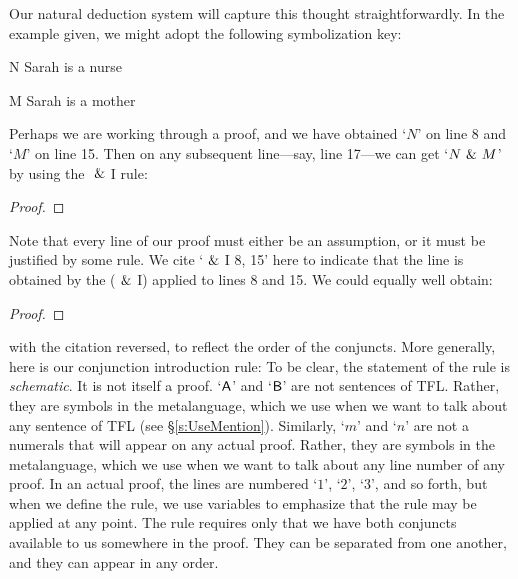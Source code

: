 Our natural deduction system will capture this thought straightforwardly. In the example given, we might adopt the following symbolization key:
	\begin{ekey}
		\item[N] Sarah is a nurse
		\item[M] Sarah is a mother
	\end{ekey}
Perhaps we are working through a proof, and we have obtained `$N$' on line 8 and `$M$' on line 15. Then on any subsequent line---say, line 17---we can get `$N ~\&~ M$' by using the $~\&~$I rule:
\begin{proof}
	 \by{\ldots}{}
	 \by{\ldots}{}
	 
\end{proof}
Note that every line of our proof must either be an assumption, or it must be justified by some rule. We cite `$~\&~$I 8, 15' here to indicate that the line is obtained by the  ($~\&~$I) applied to lines 8 and 15. We could equally well obtain:
\begin{proof}
	 
\end{proof}
with the citation reversed, to reflect the order of the conjuncts. More generally, here is our conjunction introduction rule:
To be clear, the statement of the rule is \emph{schematic}. It is not itself a proof.  `$\mathsf{A}$' and `$\mathsf{B}$' are not sentences of TFL. Rather, they are symbols in the metalanguage, which we use when we want to talk about any sentence of TFL (see \S\ref{s:UseMention}). Similarly, `$m$' and `$n$' are not a numerals that will appear on any actual proof. Rather, they are symbols in the metalanguage, which we use when we want to talk about any line number of any proof. In an actual proof, the lines are numbered `$1$', `$2$', `$3$', and so forth, but when we define the rule, we use variables to emphasize that the rule may be applied at any point. The rule requires only that we have both conjuncts available to us somewhere in the proof. They can be separated from one another, and they can appear in any order. 

